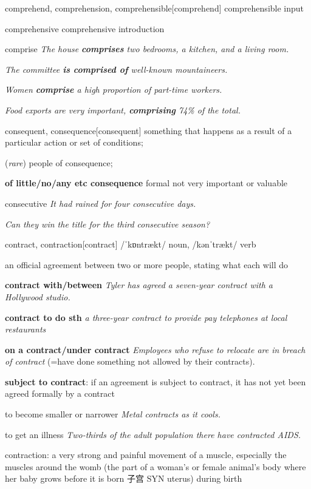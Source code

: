 \begin{word}{comprehend, comprehension, comprehensible}[comprehend]
    comprehensible input
\end{word}

\begin{word}{comprehensive}
    comprehensive introduction
\end{word}

\begin{word}{comprise}
    \textit{The house \textbf{comprises} two bedrooms, a kitchen, and a living room.} 
    
    \textit{The committee \textbf{is comprised of} well-known mountaineers. }
    
    \textit{Women \textbf{comprise} a high proportion of part-time workers.} 
    
    \textit{Food exports are very important, \textbf{comprising} 74\% of the total.}
\end{word}

\begin{word}{consequent, consequence}[consequent]
    something that happens as a result of a particular action or set of conditions; 
    
    (\textit{rare}) people of consequence; 
    
    \textbf{of little/no/any etc consequence} formal not very important or valuable
\end{word}

\begin{word}{consecutive}
   \textit{ It had rained for four consecutive days.}

    \textit{Can they win the title for the third consecutive season?}
\end{word}

\begin{word}{contract, contraction}[contract]
    /ˈkɒntrækt/ noun, /kənˈtrækt/ verb

    an official agreement between two or more people, stating what each will do

    \textbf{contract with/between}
    \textit{Tyler has agreed a seven-year contract with a Hollywood studio.}

    \textbf{contract to do sth}
    \textit{a three-year contract to provide pay telephones at local restaurants}

    \textbf{on a contract/under contract}
    \textit{Employees who refuse to relocate are in breach of contract} (=have done something not allowed by their contracts).


    \textbf{subject to contract}: if an agreement is subject to contract, it has not yet been agreed formally by a contract

    to become smaller or narrower
    \textit{Metal contracts as it cools.}

    to get an illness
    \textit{Two-thirds of the adult population there have contracted AIDS.}

    contraction: a very strong and painful movement of a muscle, especially the muscles around the womb (the part of a woman's or female animal's body where her baby grows before it is born 子宫 SYN  uterus) during birth
\end{word}